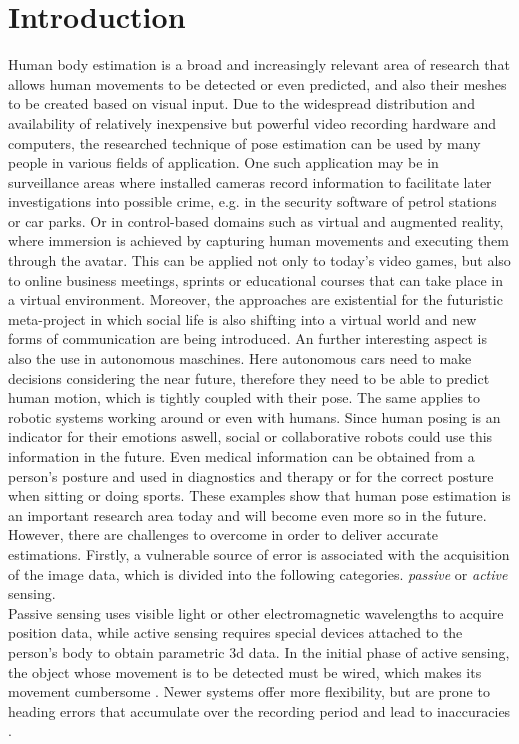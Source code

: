 \section{Introduction}
Human body estimation is a broad and increasingly relevant area of research that allows human movements to be detected or even predicted, and also their meshes to be created based on visual input. Due to the widespread distribution and availability of relatively inexpensive but powerful video recording hardware and computers, the researched technique of pose estimation can be used by many people in various fields of application. One such application may be in surveillance areas where installed cameras record information to facilitate later investigations into possible crime, e.g. in the security software of petrol stations or car parks. Or in control-based domains such as  virtual and augmented reality, where immersion is achieved by capturing human movements and executing them through the avatar. This can be applied not only to today's video games, but also to online business meetings, sprints or educational courses that can take place in a virtual environment. Moreover, the approaches are existential for the futuristic meta-project in which social life is also shifting into a virtual world and new forms of communication are being introduced. An further interesting aspect is also the use in autonomous maschines. Here autonomous cars need to make decisions considering the near future, therefore they need to be able to predict human motion, which is tightly coupled with their pose. The same applies to robotic systems working around or even with humans. Since human posing is an indicator for their emotions aswell, social or collaborative robots could use this information in the future. Even medical information can be obtained from a person's posture and used in diagnostics and therapy or for the correct posture when sitting or doing sports. These examples show that human pose estimation is an important research area today and will become even more so in the future. However, there are challenges to overcome in order to deliver accurate estimations. Firstly, a vulnerable source of error is associated with the acquisition of the image data, which is divided into the following categories. \emph{passive} or \emph{active} sensing. 
\\
Passive sensing uses visible light or other electromagnetic wavelengths to acquire position data, while active sensing requires special devices attached to the person's body to obtain parametric 3d data. In the initial phase of active sensing, the object whose movement is to be detected must be wired, which makes its movement cumbersome \cite{mocap}. Newer systems offer more flexibility, but are prone to heading errors that accumulate over the recording period and lead to inaccuracies \cite{vip}.
